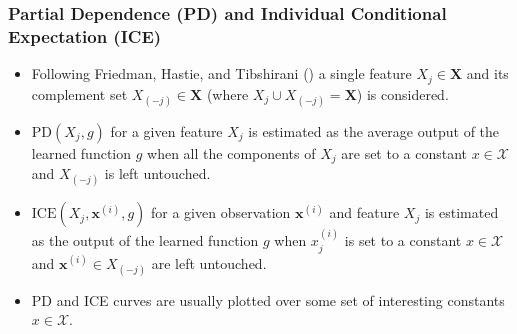 \documentclass[11pt,
               aspectratio=169
               ]{beamer}
\begin{document}
		\begin{frame}
		
			\frametitle{Partial Dependence (PD) and Individual Conditional Expectation (ICE)}
			
				\vspace{-10 pt}
			
				\begin{itemize}
					
					\item Following Friedman, Hastie, and Tibshirani (\citeyear{esl}) a single feature $X_j \in \mathbf{X}$ and its complement set $X_{(-j)} \in \mathbf{X}$ (where $X_j \cup X_{(-j)} = \mathbf{X}$) is considered.
					
					\item $\text{PD}(X_j, g)$ for a given feature $X_j$ is estimated as the average output of the learned function $g$ when all the components of $X_j$ are set to a constant $x \in \mathcal{X}$ and $X_{(-j)}$ is left untouched.
					
					\item $\text{ICE}(X_j, \mathbf{x}^{(i)}, g)$ for a given observation $\mathbf{x}^{(i)}$ and feature $X_j$ is estimated as the output of the learned function $g$ when $x^{(i)}_j$ is set to a constant $x \in \mathcal{X}$ and $\mathbf{x}^{(i)} \in X_{(-j)}$ are left untouched.
					
					\item PD and ICE curves are usually plotted over some set of interesting constants $x \in \mathcal{X}$. 
				
				\end{itemize}
			
		\end{frame}
	
\end{document}
